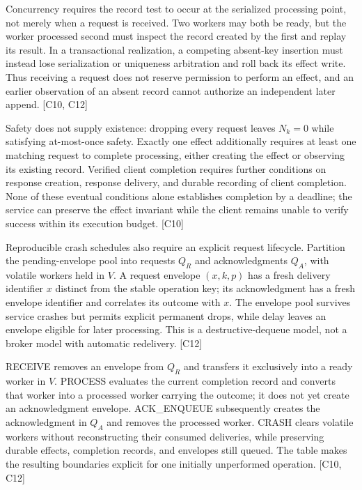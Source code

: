 \documentclass[11pt]{article}
\begin{document}
Concurrency requires the record test to occur at the serialized processing point, not merely when a request is received. Two workers may both be ready, but the worker processed second must inspect the record created by the first and replay its result. In a transactional realization, a competing absent-key insertion must instead lose serialization or uniqueness arbitration and roll back its effect write. Thus receiving a request does not reserve permission to perform an effect, and an earlier observation of an absent record cannot authorize an independent later append. [C10, C12]

Safety does not supply existence: dropping every request leaves $N_k=0$ while satisfying at-most-once safety. Exactly one effect additionally requires at least one matching request to complete processing, either creating the effect or observing its existing record. Verified client completion requires further conditions on response creation, response delivery, and durable recording of client completion. None of these eventual conditions alone establishes completion by a deadline; the service can preserve the effect invariant while the client remains unable to verify success within its execution budget. [C10]

Reproducible crash schedules also require an explicit request lifecycle. Partition the pending-envelope pool into requests $Q_R$ and acknowledgments $Q_A$, with volatile workers held in $V$. A request envelope $(x,k,p)$ has a fresh delivery identifier $x$ distinct from the stable operation key; its acknowledgment has a fresh envelope identifier and correlates its outcome with $x$. The envelope pool survives service crashes but permits explicit permanent drops, while delay leaves an envelope eligible for later processing. This is a destructive-dequeue model, not a broker model with automatic redelivery. [C12]

RECEIVE removes an envelope from $Q_R$ and transfers it exclusively into a ready worker in $V$. PROCESS evaluates the current completion record and converts that worker into a processed worker carrying the outcome; it does not yet create an acknowledgment envelope. ACK\_\allowbreak{}ENQUEUE subsequently creates the acknowledgment in $Q_A$ and removes the processed worker. CRASH clears volatile workers without reconstructing their consumed deliveries, while preserving durable effects, completion records, and envelopes still queued. The table makes the resulting boundaries explicit for one initially unperformed operation. [C10, C12]
\end{document}
